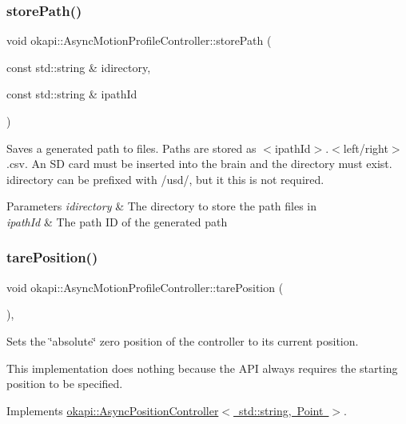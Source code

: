 \subsubsection{\texorpdfstring{storePath()}{storePath()}}
{\footnotesize\ttfamily void okapi\+::\+Async\+Motion\+Profile\+Controller\+::store\+Path (\begin{DoxyParamCaption}\item[{const std\+::string \&}]{idirectory,  }\item[{const std\+::string \&}]{ipath\+Id }\end{DoxyParamCaption})}

Saves a generated path to files. Paths are stored as {\ttfamily $<$ipath\+Id$>$.$<$left/right$>$.csv}. An SD card must be inserted into the brain and the directory must exist. {\ttfamily idirectory} can be prefixed with {\ttfamily /usd/}, but it this is not required.


\begin{DoxyParams}{Parameters}
{\em idirectory} & The directory to store the path files in \\
\hline
{\em ipath\+Id} & The path ID of the generated path \\
\hline
\end{DoxyParams}
\mbox{\label{classokapi_1_1AsyncMotionProfileController_afc3476c87e3428f9f166273688e45249}} 
\subsubsection{\texorpdfstring{tarePosition()}{tarePosition()}}
{\footnotesize\ttfamily void okapi\+::\+Async\+Motion\+Profile\+Controller\+::tare\+Position (\begin{DoxyParamCaption}{ }\end{DoxyParamCaption})\hspace{0.3cm}{\ttfamily [override]}, {\ttfamily [virtual]}}

Sets the \char`\"{}absolute\char`\"{} zero position of the controller to its current position.

This implementation does nothing because the A\+PI always requires the starting position to be specified. 

Implements \mbox{\hyperlink{classokapi_1_1AsyncPositionController_a0af03d0035343cbf843a19374f38a059}{okapi\+::\+Async\+Position\+Controller$<$ std\+::string, Point $>$}}.

